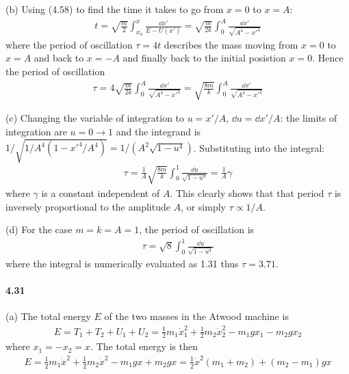 \documentclass[../problems.tex]{subfiles}
\begin{document}
(b) Using (4.58) to find the time it takes to go from $x=0$ to $x=A$:
\begin{align}
    t = \sqrt{\frac{m}{2}} \int_{x_o}^x \frac{\dd{x'}}{E - U(x')}
      = \sqrt{\frac{m}{2k}} \int_0^A \frac{\dd{x'}}{\sqrt{A^4 - x'^4}}
\end{align}
where the period of oscillation $\tau = 4t$ describes the mass moving from $x=0$ to $x=A$ and back
to $x=-A$ and finally back to the initial posistion $x=0$. Hence the period of oscillation
\begin{align*}
    \tau = 4 \sqrt{\frac{m}{2k}} \int_0^A \frac{\dd{x'}}{\sqrt{A^4 - x'^4}}
    = \sqrt{\frac{8m}{k}} \int_0^A \frac{\dd{x'}}{\sqrt{A^4 - x'^4}}
\end{align*}

(c) Changing the variable of integration to $u = x' / A$, $\dd{u} = \dd{x'} / A$: the limits of
integration are $u = 0 \to 1$ and the integrand is $1/\sqrt{1/A^4(1 - x'^4/A^4)}
= 1/(A^2\sqrt{1-u^4})$. Substituting into the integral:
\begin{align*}
    \tau = \frac{1}{A} \sqrt{\frac{8m}{k}} \int_0^1 \frac{\dd{u}}{\sqrt{1 - u^4}}
    = \frac{1}{A} \gamma
\end{align*}
where $\gamma$ is a constant independent of $A$. This clearly shows that that period $\tau$ is
inversely proportional to the amplitude $A$, or simply $\tau \propto 1/A$.

(d) For the case $m = k = A = 1$, the period of oscillation is
\begin{align*}
    \tau = \sqrt{8} \int_0^1 \frac{\dd{u}}{\sqrt{1-u^4}}
\end{align*}
where the integral is numerically evaluated as 1.31 thus $\tau = 3.71$.

\paragraph{4.31}
(a) The total energy $E$ of the two masses in the Atwood machine is
\begin{align*}
    E = T_1 + T_2 + U_1 + U_2
    = \frac{1}{2} m_1 \dot{x}_1^2 + \frac{1}{2} m_2 \dot{x}_2^2 - m_1 g x_1 - m_2 g x_2
\end{align*}
where $x_1 = -x_2 = x$. The total energy is then
\begin{align*}
    E = \frac{1}{2} m_1 \dot{x}^2 + \frac{1}{2} m_2 \dot{x}^2 - m_1 g x + m_2 g x
    = \frac{1}{2} \dot{x}^2 (m_1 + m_2) + (m_2 - m_1) g x
\end{align*}
\end{document}
